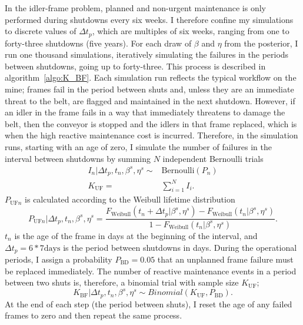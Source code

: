In the idler-frame problem, planned and non-urgent maintenance is only performed during shutdowns every six weeks. I therefore confine my simulations to discrete values of $\Delta t_p$, which are multiples of six weeks, ranging from one to forty-three shutdowns (five years). For each draw of $\beta$ and $\eta$ from the posterior, I run one thousand simulations, iteratively simulating the failures in the periods between shutdowns, going up to forty-three. This process is described in algorithm~\ref{algo:K_BF}. Each simulation run reflects the typical workflow on the mine; frames fail in the period between shuts and, unless they are an immediate threat to the belt, are flagged and maintained in the next shutdown. However, if an idler in the frame fails in a way that immediately threatens to damage the belt, then the conveyor is stopped and the idlers in that frame replaced, which is when the high reactive maintenance cost is incurred. Therefore, in the simulation runs, starting with an age of zero, I simulate the number of failures in the interval between shutdowns by summing $N$ independent Bernoulli trials
\begin{align*}
 I_n|\Delta t_p, t_n, \beta^s, \eta^s \sim & \mbox{Bernoulli}(P_{n}) \\
 K_{\text{UF}}                           = & \sum^N_{i = 1} I_i.
\end{align*}
$P_{\text{UF} n}$ is calculated according to the Weibull lifetime distribution
\begin{equation*}
 P_{\text{UF} n}|\Delta t_p, t_n, \beta^s, \eta^s = \frac{F_{\text{Weibull}}(t_n + \Delta t_p|\beta^s, \eta^s) - F_{\text{Weibull}}(t_n|\beta^s, \eta^s)}{1 - F_{\text{Weibull}}(t_n|\beta^s, \eta^s)}.
\end{equation*}
$t_n$ is the age of the frame in days at the beginning of the interval, and $\Delta t_p = 6 * 7 \text{days}$ is the period between shutdowns in days.
During the operational periods, I assign a probability $P_{\text{BD}} = 0.05$ that an unplanned frame failure must be replaced immediately. The number of reactive maintenance events in a period between two shuts is, therefore, a binomial trial with sample size $K_{\text{UF}}$;
\begin{equation*}
 K_{\text{BF}}|\Delta t_p, t_n, \beta^s, \eta^s \sim Binomial(K_{\text{UF}}, P_{\text{BD}}).
\end{equation*}
At the end of each step (the period between shuts), I reset the age of any failed frames to zero and then repeat the same process.

